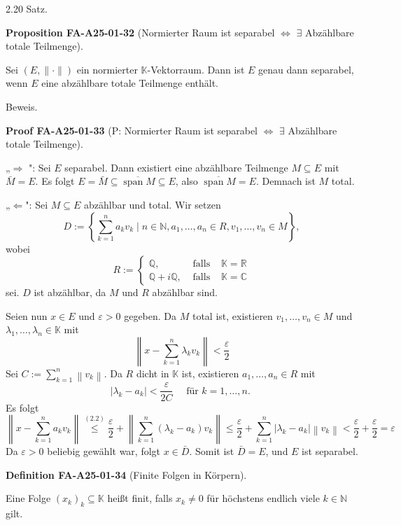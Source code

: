 \documentclass[10pt, letterpaper]{article}
\newcommand{\CustomHeading}[3]{%
  \par\medskip\noindent%
  \textbf{#1 #2} \textnormal{(#3)}.\enskip%
}
\newenvironment{DEF}[2]{\begin{unitbox}\CustomHeading{Definition}{#1}{#2}}{\end{unitbox}}
\newenvironment{PROP}[2]{\begin{unitbox}\CustomHeading{Proposition}{#1}{#2}}{\end{unitbox}}
\newenvironment{PROOF}[2]{\begin{unitbox}\CustomHeading{Proof}{#1}{#2}}{\end{unitbox}}
\begin{document}
2.20 Satz. 

\begin{PROP}{FA-A25-01-32}{Normierter Raum ist separabel $\Leftrightarrow$ $\exists$ Abzählbare totale Teilmenge}
Sei $(E,\|\cdot\|)$ ein normierter $\mathbb{K}$-Vektorraum. Dann ist $E$ genau dann separabel, wenn $E$ eine abzählbare totale Teilmenge enthält.
\end{PROP}

Beweis. 

\begin{PROOF}{FA-A25-01-33}{P: Normierter Raum ist separabel $\Leftrightarrow$ $\exists$ Abzählbare totale Teilmenge}
„$\Longrightarrow$ ": Sei $E$ separabel. Dann existiert eine abzählbare Teilmenge $M \subseteq E$ mit $\bar{M}=E$. Es folgt $E=\bar{M} \subseteq \overline{\operatorname{span} M} \subseteq E$, also $\overline{\operatorname{span} M}=E$. Demnach ist $M$ total.

„$\Longleftarrow$": Sei $M \subseteq E$ abzählbar und total. Wir setzen
$$
D:=\left\{\sum_{k=1}^{n} a_{k} v_{k} \mid n \in \mathbb{N}, a_{1}, \ldots, a_{n} \in R, v_{1}, \ldots, v_{n} \in M\right\},
$$
wobei
$$
R:=\left\{\begin{array}{lll}
\mathbb{Q}, & \text { falls } & \mathbb{K}=\mathbb{R} \\
\mathbb{Q}+i \mathbb{Q}, & \text { falls } & \mathbb{K}=\mathbb{C}
\end{array}\right.
$$
sei. $D$ ist abzählbar, da $M$ und $R$ abzählbar sind.

Seien nun $x \in E$ und $\varepsilon>0$ gegeben. Da $M$ total ist, existieren $v_{1}, \ldots, v_{n} \in M$ und $\lambda_{1}, \ldots, \lambda_{n} \in \mathbb{K}$ mit
$$
\left\|x-\sum_{k=1}^{n} \lambda_{k} v_{k}\right\|<\frac{\varepsilon}{2}
$$
Sei $C:=\sum_{k=1}^{n}\left\|v_{k}\right\|$. Da $R$ dicht in $\mathbb{K}$ ist, existieren $a_{1}, \ldots, a_{n} \in R$ mit
$$
\left|\lambda_{k}-a_{k}\right|<\frac{\varepsilon}{2 C} \quad \text { für } k=1, \ldots, n \text {. }
$$
Es folgt
$$
\left\|x-\sum_{k=1}^{n} a_{k} v_{k}\right\| \stackrel{(2.2)}{\leq} \frac{\varepsilon}{2}+\left\|\sum_{k=1}^{n}\left(\lambda_{k}-a_{k}\right) v_{k}\right\| \leq \frac{\varepsilon}{2}+\sum_{k=1}^{n}\left|\lambda_{k}-a_{k}\right|\left\|v_{k}\right\|<\frac{\varepsilon}{2}+\frac{\varepsilon}{2}=\varepsilon
$$
Da $\varepsilon>0$ beliebig gewählt war, folgt $x \in \bar{D}$. Somit ist $\bar{D}=E$, und $E$ ist separabel.
\end{PROOF}


\begin{DEF}{FA-A25-01-34}{Finite Folgen in Körpern}
Eine Folge $\left(x_{k}\right)_{k} \subseteq \mathbb{K}$ heißt finit, falls $x_{k} \neq 0$ für höchstens endlich viele $k \in \mathbb{N}$ gilt.
\end{DEF}
\end{document}
